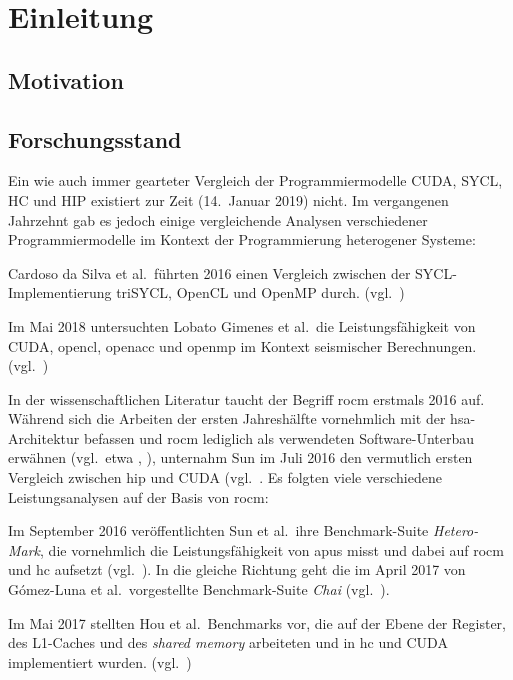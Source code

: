 \section{Einleitung}
\label{einleitung}

\subsection{Motivation}
\label{einleitung:motivation}

\subsection{Forschungsstand}
\label{einleitung:forschung}

Ein wie auch immer gearteter Vergleich der Programmiermodelle CUDA, SYCL, HC
und HIP existiert zur Zeit (14.\ Januar 2019) nicht. Im vergangenen Jahrzehnt
gab es jedoch einige vergleichende Analysen verschiedener Programmiermodelle im
Kontext der Programmierung heterogener Systeme:

Cardoso da Silva et al.\ führten 2016 einen Vergleich zwischen der
SYCL-Implementierung triSYCL, OpenCL und OpenMP durch.
(vgl.~\cite{dasilva2016})

Im Mai 2018 untersuchten Lobato Gimenes et al.\ die Leistungsfähigkeit von
CUDA, \gls{opencl}, \gls{openacc} und \gls{openmp} im Kontext seismischer
Berechnungen.
(vgl.~\cite{lobatogimenes2018})

In der wissenschaftlichen Literatur taucht der Begriff \gls{rocm} erstmals 2016
auf. Während sich die Arbeiten der ersten Jahreshälfte vornehmlich mit der
\gls{hsa}-Architektur befassen und \gls{rocm} lediglich als verwendeten
Software-Unterbau erwähnen (vgl.\ etwa \cite{li2016}, \cite{larsson2016}),
unternahm Sun im Juli 2016 den vermutlich ersten Vergleich zwischen \gls{hip}
und CUDA (vgl.~\cite{sun2016}. Es folgten viele verschiedene
Leistungsanalysen auf der Basis von \gls{rocm}:

Im September 2016 veröffentlichten Sun et al.\ ihre Benchmark-Suite
\textit{Hetero-Mark}, die vornehmlich die Leistungsfähigkeit von \gls{apu}s
misst und dabei auf \gls{rocm} und \gls{hc} aufsetzt (vgl.~\cite{sunyifan2016}).
In die gleiche Richtung geht die im April 2017 von Gómez-Luna et al.\
vorgestellte Benchmark-Suite \textit{Chai} (vgl.~\cite{gomezluna2017}). 

Im Mai 2017 stellten Hou et al.\ Benchmarks vor, die auf der Ebene der Register,
des L1-Caches und des \textit{shared memory} arbeiteten und in \gls{hc} und
CUDA implementiert wurden. (vgl.~\cite{hou2017})

